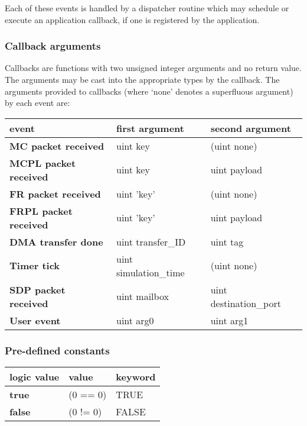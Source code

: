\documentclass[11pt,a4paper,twoside]{article}
\begin{document}
Each of these events is handled by a dispatcher routine which may schedule
or execute an application callback, if one is registered by the
application.

\subsubsection{Callback arguments}

Callbacks are functions with two unsigned integer arguments and no
return value. The arguments may be cast into the appropriate types by
the callback. The arguments provided to callbacks (where `none'
denotes a superfluous argument) by each event are:

\begin{center}
\renewcommand{\arraystretch}{1.2}
\begin{tabularx}{\textwidth}{| p{\fcw} X X |}
\hline
\textbf{event} & \textbf{first argument} & \textbf{second argument} \\%
\hline
\hline
\textbf{MC packet received} & uint key & (uint none) \\%
\textbf{MCPL packet received} & uint key & uint payload \\%
\textbf{FR packet received} & uint 'key' & (uint none) \\%
\textbf{FRPL packet received} & uint 'key' & uint payload \\%
\textbf{DMA transfer done} & uint transfer\_ID & uint tag \\%
\textbf{Timer tick} & uint simulation\_time & (uint none) \\%
\textbf{SDP packet received} & uint mailbox & uint destination\_port \\%
\textbf{User event} & uint arg0 & uint arg1 \\%
\hline
\end{tabularx}
\end{center}

\subsubsection{Pre-defined constants}

\begin{center}
\renewcommand{\arraystretch}{1.2}
\begin{tabularx}{\textwidth}{| p{\fcw} X X |}
\hline
\textbf{logic value} & \textbf{value} & \textbf{keyword} \\%
\hline
\hline
\textbf{true} & (0 == 0) & TRUE \\%
\textbf{false} & (0 != 0) & FALSE \\%
\hline
\end{tabularx}
\end{center}
\end{document}
